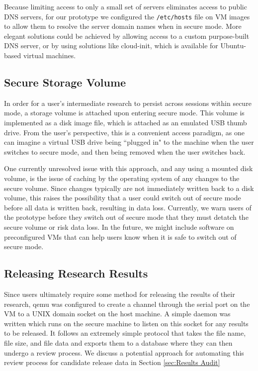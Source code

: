 \documentclass{acm_proc_article-sp}
\begin{document}
Because limiting access to only a small set of servers eliminates access to
public DNS servers, for our prototype we configured the \texttt{/etc/hosts}
file on VM images to allow them to resolve the server domain names when in
secure mode.  More elegant solutions could be achieved by allowing access to a
custom purpose-built DNS server, or by using solutions like
cloud-init\cite{cloudinit}, which is available for Ubuntu-based virtual
machines.

\subsection{Secure Storage Volume}

In order for a user's intermediate research to persist across sessions within
secure mode, a storage volume is attached upon entering secure mode.  This
volume is implemented as a disk image file, which is attached as an emulated USB
thumb drive.  From the user's perspective, this is a convenient access paradigm,
as one can imagine a virtual USB drive being ``plugged in" to the machine when
the user switches to secure mode, and then being removed when the user switches
back.

One currently unresolved issue with this approach, and any using a mounted disk
volume, is the issue of caching by the operating system of any changes to the
secure volume.  Since changes typically are not immediately written back to a
disk volume, this raises the possibility that a user could switch out of secure
mode before all data is written back, resulting in data loss.  Currently, we
warn users of the prototype before they switch out of secure mode that they must
detatch the secure volume or risk data loss.  In the future, we might include
software on preconfigured VMs that can help users know when it is safe to switch
out of secure mode.

\subsection{Releasing Research Results}

Since users ultimately require some method for releasing the results of their
research, qemu was configured to create a channel through the serial port on the
VM to a UNIX domain socket on the host machine.  A simple daemon was written
which runs on the secure machine to listen on this socket for any results to be
released.  It follows an extremely simple protocol that takes the file name,
file size, and file data and exports them to a database where they can then
undergo a review process.  We discuss a potential approach for automating this
review process for candidate release data in Section \ref{sec:Results Audit}
\end{document}
